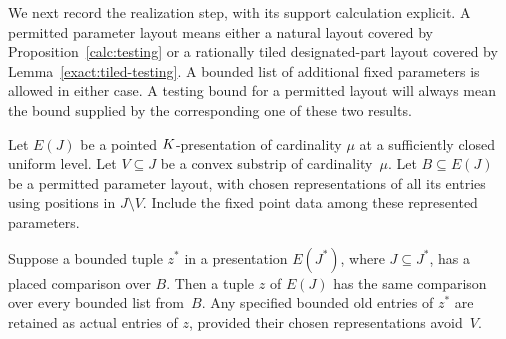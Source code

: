 We next record the realization step, with its support calculation
explicit.  A permitted parameter layout means either a natural
layout covered by Proposition~\ref{calc:testing} or a rationally
tiled designated-part layout covered by
Lemma~\ref{exact:tiled-testing}.  A bounded list of additional fixed
parameters is allowed in either case.  A testing bound for a
permitted layout will always mean the bound supplied by the
corresponding one of these two results.

\begin{lemma}
\label{exact:internal-realization}
Let $E(J)$ be a pointed $K$-presentation of cardinality $\mu$ at
a sufficiently closed uniform level.  Let $V\subseteq J$ be a
convex substrip of cardinality~$\mu$.  Let $B\subseteq E(J)$ be
a permitted parameter layout, with chosen representations of all its
entries using positions in $J\setminus V$.  Include the fixed
point data among these represented parameters.

Suppose a bounded tuple $z^*$ in a presentation $E(J^*)$, where
$J\subseteq J^*$, has a placed comparison over $B$.  Then a tuple
$z$ of $E(J)$ has the same comparison over every bounded list
from~$B$.  Any specified bounded old entries of $z^*$ are retained
as actual entries of $z$, provided their chosen representations
avoid~$V$.
\end{lemma}

